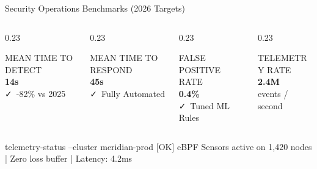 \documentclass[aspectratio=169, 10pt]{beamer}
\begin{document}
\begin{frame}{Security Operations Benchmarks (2026 Targets)}
  \begin{columns}[T]
    \begin{column}{0.23\textwidth}
      \begin{metricbox}{}
        {\ttfamily\color{textmuted}\tiny MEAN TIME TO DETECT}\\[2pt]
        {\Huge\bfseries\color{cybercyan} 14s}\\[4pt]
        {\tiny\color{cybergreen}\faCheck\ -82\% vs 2025}
      \end{metricbox}
    \end{column}
    
    \begin{column}{0.23\textwidth}
      \begin{metricbox}{}
        {\ttfamily\color{textmuted}\tiny MEAN TIME TO RESPOND}\\[2pt]
        {\Huge\bfseries\color{cybergreen} 45s}\\[4pt]
        {\tiny\color{cybergreen}\faCheck\ Fully Automated}
      \end{metricbox}
    \end{column}

    \begin{column}{0.23\textwidth}
      \begin{metricbox}{}
        {\ttfamily\color{textmuted}\tiny FALSE POSITIVE RATE}\\[2pt]
        {\Huge\bfseries\color{cyberamber} 0.4\%}\\[4pt]
        {\tiny\color{cybergreen}\faCheck\ Tuned ML Rules}
      \end{metricbox}
    \end{column}

    \begin{column}{0.23\textwidth}
      \begin{metricbox}{}
        {\ttfamily\color{textmuted}\tiny TELEMETRY RATE}\\[2pt]
        {\Huge\bfseries\color{cyberpurple} 2.4M}\\[4pt]
        {\tiny\color{textmuted} events / second}
      \end{metricbox}
    \end{column}
  \end{columns}

  \vspace{8pt}
  \begin{terminalbox}{telemetry-status --cluster meridian-prod}
    {\ttfamily\color{cybergreen}\small [OK] eBPF Sensors active on 1,420 nodes | Zero loss buffer | Latency: 4.2ms}
  \end{terminalbox}
\end{frame}
\end{document}
